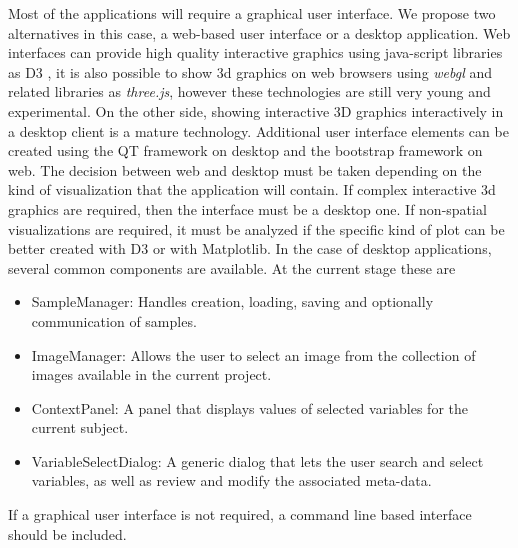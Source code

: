Most of the applications will require a graphical user interface. We propose two alternatives in this case, a web-based user interface or a desktop application. Web interfaces can provide high quality interactive graphics using java-script libraries as D3 \autocite{bostock_d3_2011}, it is also possible to show 3d graphics on web browsers using \emph{webgl} and related libraries as \emph{three.js}, however these technologies are still very young and experimental. On the other side, showing interactive 3D graphics interactively in a desktop client is a mature technology. Additional user interface elements can be created using the QT framework on desktop and the bootstrap framework on web. The decision between web and desktop must be taken depending on the kind of visualization that the application will contain. If complex interactive 3d graphics are required, then the interface must be a desktop one. If non-spatial visualizations are required, it must be analyzed if the specific kind of plot can be better created with D3 or with Matplotlib. In the case of desktop applications, several common components are available. At the current stage these are

\begin{itemize}
\item SampleManager: Handles creation, loading, saving and optionally communication of samples.
\item ImageManager: Allows the user to select an image from the collection of images available in the current project.
\item ContextPanel: A panel that displays values of selected variables for the current subject.
\item VariableSelectDialog: A generic dialog that lets the user search and select variables, as well as review and modify the associated meta-data.
\end{itemize}
If a graphical user interface is not required, a command line based interface should be included. 

